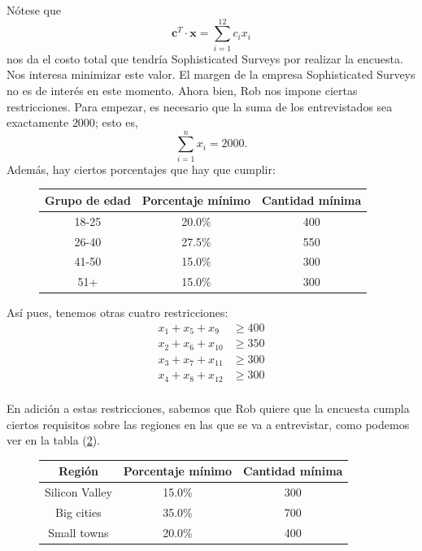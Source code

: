 \documentclass[12pt]{article}
\begin{document}
Nótese que 
\[ \pmb{c}^T \cdot \pmb{x} = \sum_{i=1}^{12}c_i x_i \]
nos da el costo total que tendría Sophisticated Surveys por realizar la encuesta. Nos interesa minimizar este valor. El margen de la empresa Sophisticated Surveys no es de interés en este momento. Ahora bien, Rob nos impone ciertas restricciones. Para empezar, es necesario que la suma de los entrevistados sea exactamente $2000$; esto es, 
\[ \sum_{i=1}^n x_i = 2000. \]
Además, hay ciertos porcentajes que hay que cumplir:
\begin{figure}[ht]
    \centering
    \begin{tabular}{|c|c|c|}
     \hline
     \textbf{Grupo de edad} & \textbf{Porcentaje mínimo} & \textbf{Cantidad mínima} \\
     \hline 
     18-25 & 20.0\%   & 400 \\
     26-40 & 27.5\%   & 550 \\
     41-50 & 15.0\%   & 300 \\
     51+   & 15.0\%   & 300 \\
     \hline 
    \end{tabular}    
    \label{fig:tabla3}
\end{figure}

Así pues, tenemos otras cuatro restricciones:
\begin{align*}
    x_1 + x_5 + x_9 &\geq 400 \\
    x_2 + x_6 + x_{10} &\geq 350 \\
    x_3 + x_7 + x_{11} &\geq 300 \\
    x_4 + x_8 + x_{12} &\geq 300 \\
\end{align*}

En adición a estas restricciones, sabemos que Rob quiere que la encuesta cumpla ciertos requisitos sobre las regiones en las que se va a entrevistar, como podemos ver en la tabla (\ref{fig:tabla4}).
\begin{figure}[ht]
    \centering
    \begin{tabular}{|c|c|c|}
     \hline
     \textbf{Región} & \textbf{Porcentaje mínimo} & \textbf{Cantidad mínima} \\
     \hline 
     Silicon Valley & 15.0\%   & 300 \\
     Big cities     & 35.0\%   & 700 \\
     Small towns    & 20.0\%   & 400 \\     
     \hline 
    \end{tabular}    
    \label{fig:tabla4}
\end{figure}
\end{document}
